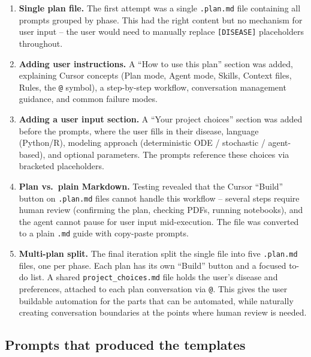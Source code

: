 \documentclass[11pt]{article}
\begin{document}
\begin{enumerate}
  \item \textbf{Single plan file.} The first attempt was a single \texttt{.plan.md} file containing all prompts grouped by phase. This had the right content but no mechanism for user input -- the user would need to manually replace \texttt{[DISEASE]} placeholders throughout.

  \item \textbf{Adding user instructions.} A ``How to use this plan'' section was added, explaining Cursor concepts (Plan mode, Agent mode, Skills, Context files, Rules, the \texttt{@} symbol), a step-by-step workflow, conversation management guidance, and common failure modes.

  \item \textbf{Adding a user input section.} A ``Your project choices'' section was added before the prompts, where the user fills in their disease, language (Python/R), modeling approach (deterministic ODE / stochastic / agent-based), and optional parameters. The prompts reference these choices via bracketed placeholders.

  \item \textbf{Plan vs.\ plain Markdown.} Testing revealed that the Cursor ``Build'' button on \texttt{.plan.md} files cannot handle this workflow -- several steps require human review (confirming the plan, checking PDFs, running notebooks), and the agent cannot pause for user input mid-execution. The file was converted to a plain \texttt{.md} guide with copy-paste prompts.

  \item \textbf{Multi-plan split.} The final iteration split the single file into five \texttt{.plan.md} files, one per phase. Each plan has its own ``Build'' button and a focused to-do list. A shared \texttt{project\_choices.md} file holds the user's disease and preferences, attached to each plan conversation via \texttt{@}. This gives the user buildable automation for the parts that can be automated, while naturally creating conversation boundaries at the points where human review is needed.
\end{enumerate}

\subsection{Prompts that produced the templates}
\end{document}
